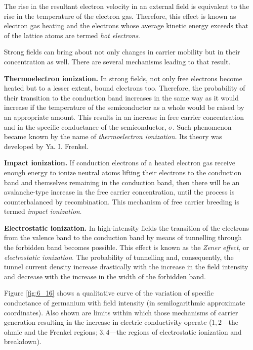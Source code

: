 The rise in the resultant electron velocity in an external field is equivalent to the rise in the temperature of the electron gas. Therefore, this effect is known as electron gas heating and the electrons whose average kinetic energy exceeds that of the lattice atoms are termed \textit{hot electrons}.

Strong fields can bring about not only changes in carrier mobility but in their concentration as well. There are several mechanisms leading to that result.

\textbf{Thermoelectron ionization.} In strong fields, not only free electrons become heated but to a lesser extent, bound electrons too. Therefore, the probability of their transition to the conduction band increases in the same way as it would increase if the temperature of the semiconductor as a whole would be raised by an appropriate amount. This results in an increase in free carrier concentration and in the specific conductance of the semiconductor, $\sigma$. Such phenomenon became known by the name of \textit{thermoelectron ionization}. Its theory was developed by Ya. I. Frenkel.

\textbf{Impact ionization.} If conduction electrons of a heated electron gas receive enough energy to ionize neutral atoms lifting their electrons to the conduction band and themselves remaining in the conduction band, then there will be an avalanche-type increase in the free carrier concentration, until the process is counterbalanced by recombination. This mechanism of free carrier breeding is termed \textit{impact ionization}.

\textbf{Electrostatic ionization.} In high-intensity fields the transition of the electrons from the valence band to the conduction band by means of tunnelling through the forbidden band becomes possible. This effect is known as the \textit{Zener effect}, or \textit{electrostatic ionization}. The probability of tunnelling and, consequently, the tunnel current density increase drastically with the increase in the field intensity and decrease with the increase in the width of the forbidden band.

Figure \ref{fig:6_16} shows a qualitative curve of the variation of specific conductance of germanium with field intensity (in semilogarithmic approximate coordinates). Also shown are limits within which those mechanisms of carrier generation resulting in the increase in electric conductivity operate ($1,2$---the ohmic and the Frenkel regions; $3,4$---the regions of electrostatic ionization and breakdown).

